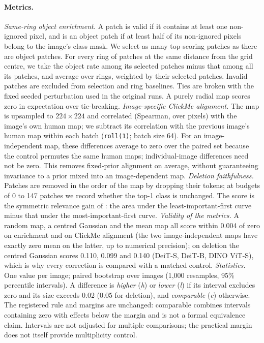 \paragraph{Metrics.} \emph{Same-ring object enrichment.} A patch is valid if it contains at least one non-ignored pixel, and is an object patch if at least half of its non-ignored pixels belong to the image's class mask. We select as many top-scoring patches as there are object patches. For every ring of patches at the same distance from the grid centre, we take the object rate among its selected patches minus that among all its patches, and average over rings, weighted by their selected patches. Invalid patches are excluded from selection and ring baselines. Ties are broken with the fixed seeded perturbation used in the original runs. A purely radial map scores zero in expectation over tie-breaking.
\emph{Image-specific ClickMe alignment.} The map is upsampled to $224{\times}224$ and correlated (Spearman, over pixels) with the image's own human map; we subtract its correlation with the previous image's human map within each batch (\texttt{roll(1)}; batch size 64). For an image-independent map, these differences average to zero over the paired set because the control permutes the same human maps; individual-image differences need not be zero. This removes fixed-prior alignment on average, without guaranteeing invariance to a prior mixed into an image-dependent map.
\emph{Deletion faithfulness.} Patches are removed in the order of the map by dropping their tokens; at budgets of 0 to 147 patches we record whether the top-1 class is unchanged. The score is the symmetric relevance gain of \citet{bluecher2024}: the area under the least-important-first curve minus that under the most-important-first curve.
\emph{Validity of the metrics.} A random map, a centred Gaussian and the mean map all score within 0.004 of zero on enrichment and on ClickMe alignment (the two image-independent maps have exactly zero mean on the latter, up to numerical precision); on deletion the centred Gaussian scores 0.110, 0.099 and 0.140 (DeiT-S, DeiT-B, DINO ViT-S), which is why every correction is compared with a matched control.
\emph{Statistics.} One value per image; paired bootstrap over images (1,000 resamples, 95\% percentile intervals). A difference is \emph{higher} (\textit{h}) or \emph{lower} (\textit{l}) if its interval excludes zero and its size exceeds 0.02 (0.05 for deletion), and \emph{comparable} (\textit{c}) otherwise. The registered rule and margins are unchanged: comparable combines intervals containing zero with effects below the margin and is not a formal equivalence claim. Intervals are not adjusted for multiple comparisons; the practical margin does not itself provide multiplicity control.

